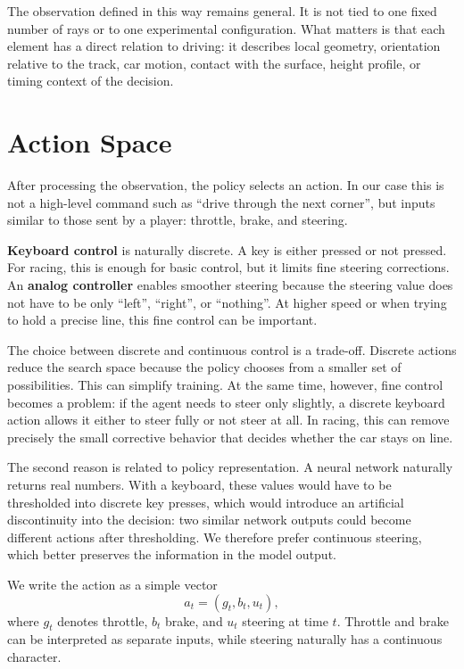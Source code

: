The observation defined in this way remains general. It is not tied to one fixed number of rays or to one experimental configuration. What matters is that each element has a direct relation to driving: it describes local geometry, orientation relative to the track, car motion, contact with the surface, height profile, or timing context of the decision.

\section{Action Space}

After processing the observation, the policy selects an action. In our case this is not a high-level command such as ``drive through the next corner'', but inputs similar to those sent by a player: throttle, brake, and steering.

\textbf{Keyboard control} is naturally discrete. A key is either pressed or not pressed. For racing, this is enough for basic control, but it limits fine steering corrections. An \textbf{analog controller} enables smoother steering because the steering value does not have to be only ``left'', ``right'', or ``nothing''. At higher speed or when trying to hold a precise line, this fine control can be important.

The choice between discrete and continuous control is a trade-off. Discrete actions reduce the search space because the policy chooses from a smaller set of possibilities. This can simplify training. At the same time, however, fine control becomes a problem: if the agent needs to steer only slightly, a discrete keyboard action allows it either to steer fully or not steer at all. In racing, this can remove precisely the small corrective behavior that decides whether the car stays on line.

The second reason is related to policy representation. A neural network naturally returns real numbers. With a keyboard, these values would have to be thresholded into discrete key presses, which would introduce an artificial discontinuity into the decision: two similar network outputs could become different actions after thresholding. We therefore prefer continuous steering, which better preserves the information in the model output.

We write the action as a simple vector
\[
    a_t = (g_t, b_t, u_t),
\]
where \(g_t\) denotes throttle, \(b_t\) brake, and \(u_t\) steering at time \(t\). Throttle and brake can be interpreted as separate inputs, while steering naturally has a continuous character.

